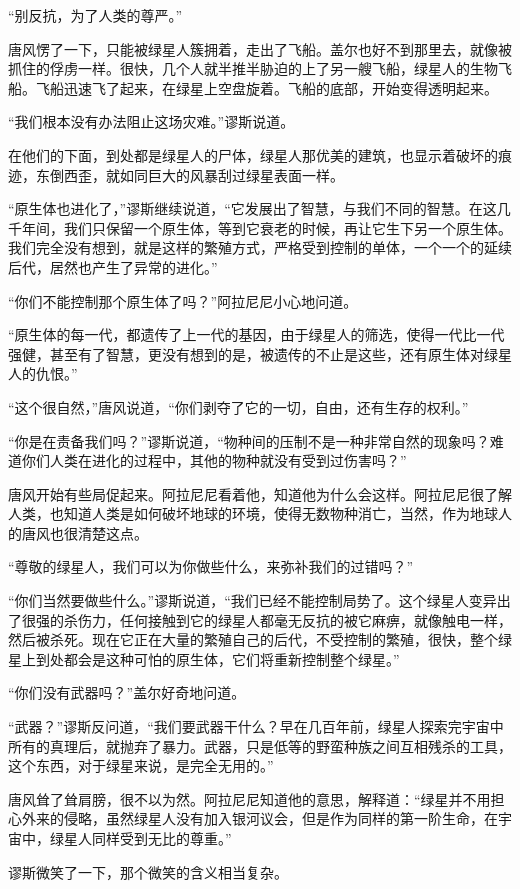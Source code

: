 “别反抗，为了人类的尊严。”

唐风愣了一下，只能被绿星人簇拥着，走出了飞船。盖尔也好不到那里去，就像被抓住的俘虏一样。很快，几个人就半推半胁迫的上了另一艘飞船，绿星人的生物飞船。飞船迅速飞了起来，在绿星上空盘旋着。飞船的底部，开始变得透明起来。

“我们根本没有办法阻止这场灾难。”谬斯说道。

在他们的下面，到处都是绿星人的尸体，绿星人那优美的建筑，也显示着破坏的痕迹，东倒西歪，就如同巨大的风暴刮过绿星表面一样。

“原生体也进化了，”谬斯继续说道，“它发展出了智慧，与我们不同的智慧。在这几千年间，我们只保留一个原生体，等到它衰老的时候，再让它生下另一个原生体。我们完全没有想到，就是这样的繁殖方式，严格受到控制的单体，一个一个的延续后代，居然也产生了异常的进化。”

“你们不能控制那个原生体了吗？”阿拉尼尼小心地问道。

“原生体的每一代，都遗传了上一代的基因，由于绿星人的筛选，使得一代比一代强健，甚至有了智慧，更没有想到的是，被遗传的不止是这些，还有原生体对绿星人的仇恨。”

“这个很自然，”唐风说道，“你们剥夺了它的一切，自由，还有生存的权利。”

“你是在责备我们吗？”谬斯说道，“物种间的压制不是一种非常自然的现象吗？难道你们人类在进化的过程中，其他的物种就没有受到过伤害吗？”

唐风开始有些局促起来。阿拉尼尼看着他，知道他为什么会这样。阿拉尼尼很了解人类，也知道人类是如何破坏地球的环境，使得无数物种消亡，当然，作为地球人的唐风也很清楚这点。

“尊敬的绿星人，我们可以为你做些什么，来弥补我们的过错吗？”

“你们当然要做些什么。”谬斯说道，“我们已经不能控制局势了。这个绿星人变异出了很强的杀伤力，任何接触到它的绿星人都毫无反抗的被它麻痹，就像触电一样，然后被杀死。现在它正在大量的繁殖自己的后代，不受控制的繁殖，很快，整个绿星上到处都会是这种可怕的原生体，它们将重新控制整个绿星。”

“你们没有武器吗？”盖尔好奇地问道。

“武器？”谬斯反问道，“我们要武器干什么？早在几百年前，绿星人探索完宇宙中所有的真理后，就抛弃了暴力。武器，只是低等的野蛮种族之间互相残杀的工具，这个东西，对于绿星来说，是完全无用的。”

唐风耸了耸肩膀，很不以为然。阿拉尼尼知道他的意思，解释道：“绿星并不用担心外来的侵略，虽然绿星人没有加入银河议会，但是作为同样的第一阶生命，在宇宙中，绿星人同样受到无比的尊重。”

谬斯微笑了一下，那个微笑的含义相当复杂。

